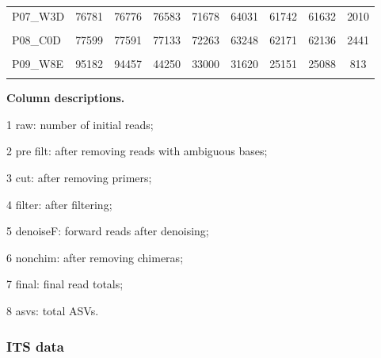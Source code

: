 \documentclass[
  10pt,
  letterpaper,
  DIV=11,
  numbers=noendperiod]{scrartcl}
\begin{document}
\begin{table}[H]
\begin{threeparttable}
\begin{tabular}[t]{lcccccccc}
\addlinespace
P07\_W3D & 76781 & 76776 & 76583 & 71678 & 64031 & 61742 & 61632 & 2010\\
\cellcolor{gray!6}{P07\_W8D} & \cellcolor{gray!6}{79032} & \cellcolor{gray!6}{79022} & \cellcolor{gray!6}{78724} & \cellcolor{gray!6}{73639} & \cellcolor{gray!6}{65125} & \cellcolor{gray!6}{62202} & \cellcolor{gray!6}{62117} & \cellcolor{gray!6}{2157}\\
P08\_C0D & 77599 & 77591 & 77133 & 72263 & 63248 & 62171 & 62136 & 2441\\
\addlinespace
\cellcolor{gray!6}{P09\_W3E} & \cellcolor{gray!6}{95566} & \cellcolor{gray!6}{95564} & \cellcolor{gray!6}{95310} & \cellcolor{gray!6}{89315} & \cellcolor{gray!6}{79799} & \cellcolor{gray!6}{76299} & \cellcolor{gray!6}{76231} & \cellcolor{gray!6}{2386}\\
P09\_W8E & 95182 & 94457 & 44250 & 33000 & 31620 & 25151 & 25088 & 813\\
\cellcolor{gray!6}{P10\_C0E} & \cellcolor{gray!6}{67583} & \cellcolor{gray!6}{67579} & \cellcolor{gray!6}{67432} & \cellcolor{gray!6}{62598} & \cellcolor{gray!6}{54075} & \cellcolor{gray!6}{53625} & \cellcolor{gray!6}{53600} & \cellcolor{gray!6}{2066}\\
\bottomrule
\end{tabular}
\begin{tablenotes}[para]
\item \textbf{Column descriptions. } 
\item 
\item[1] raw:  number of initial reads; 
\item[2] pre filt: after removing reads with ambiguous bases; 
\item[3] cut:  after removing primers; 
\item[4] filter:  after filtering; 
\item[5] denoiseF: forward reads after denoising; 
\item[6] nonchim:  after removing chimeras; 
\item[7] final: final read totals; 
\item[8] asvs: total ASVs. 
\end{tablenotes}
\end{threeparttable}
\end{table}

\hypertarget{its-data}{%
\subsubsection{ITS data}\label{its-data}}
\end{document}

